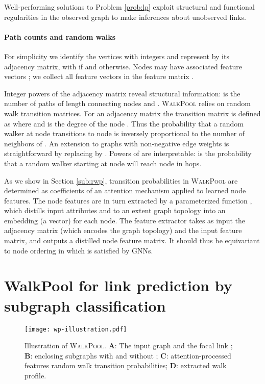 \documentclass[11pt]{article}
\newcommand{\walkpool}{\textsc{WalkPool}\xspace}
\begin{document}
Well-performing solutions to Problem \ref{prob:lp} exploit structural and functional regularities in the observed graph to make inferences about unobserved links.
\vspace{-1mm}
\paragraph{Path counts and random walks} For simplicity we identify the  vertices with integers  and represent  by its adjacency matrix,  with  if  and  otherwise.
Nodes may have associated feature vectors ; we collect all feature vectors in the feature matrix .

Integer powers of the adjacency matrix reveal structural information:  is the number of paths of length  connecting nodes  and . 
\walkpool relies on random walk transition matrices. For an adjacency matrix  the transition matrix is defined as  where  and  is the degree of the node . Thus the probability  that a random walker at node  transitions to node  is inversely proportional to the number of neighbors of . An extension to graphs with non-negative edge weights  is straightforward by replacing  by . Powers of  are interpretable:  is the probability that a random walker starting at node  will reach node  in  hops.

As we show in Section \ref{sub:rwp},  transition probabilities in \walkpool are determined as coefficients of an attention mechanism applied to learned node features. The node features are in turn extracted by a parameterized function , which distills input attributes and to an extent graph topology into an embedding (a vector) for each node. The feature extractor  takes as input the adjacency matrix (which encodes the graph topology) and the input feature matrix, and outputs a distilled node feature matrix. It should thus be equivariant to node ordering in  which is satisfied by GNNs.

\vspace{-1mm}
\section{WalkPool for link prediction by subgraph classification}
\vspace{-1mm}
\label{sec:walkpool}
\begin{figure}
\centering
\texttt{[image: wp-illustration.pdf]}
\caption{Illustration of \walkpool. \textbf{A}: The input graph and the focal link ; \textbf{B}: enclosing subgraphs with and without ; \textbf{C}: attention-processed features  random walk transition probabilities; \textbf{D}: extracted walk profile.}
\label{fig:wp-summary}
\vspace{-3mm}
\end{figure}
\end{document}
